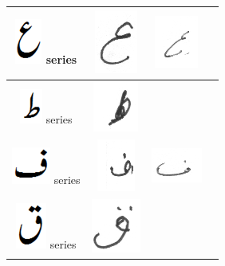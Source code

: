 \documentclass[a4paper,conference]{IEEEtran}
\begin{document}
\begin{table}[h]
\begin{tabular}{@{}cccc@{}}
\hline
\includegraphics[scale=0.15]{aien_orig} series & 
\includegraphics[scale=0.15]{131} & \includegraphics[scale=0.15]{132}  &  \\
\hline
\includegraphics[scale=0.15]{tuay_orig} series & \includegraphics[scale=0.15]{133} &  &  \\
\hline
\includegraphics[scale=0.25]{fay_orig} series & \includegraphics[scale=0.25]{134} & \includegraphics[scale=0.25]{135}  &  \\
\hline
\includegraphics[scale=0.20]{qaaf_orig} series & \includegraphics[scale=0.15]{136} & & \\

\end{tabular}
\end{table}
\end{document}
